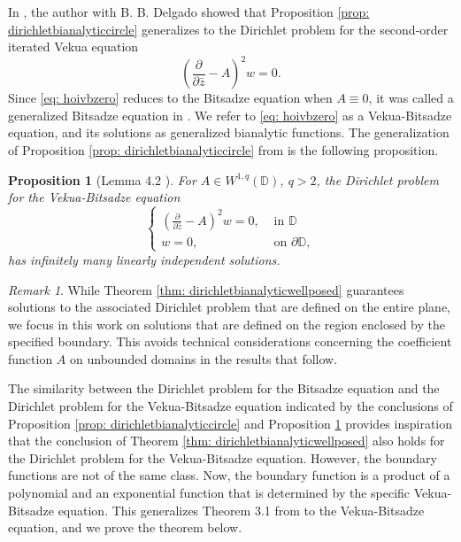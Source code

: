 \documentclass[12pt,reqno]{amsart}
\newtheorem{prop}[theorem]{Proposition}
\theoremstyle{definition}
\theoremstyle{remark}
\newtheorem{comm}[theorem]{Remark}
\newcommand{\p}{\partial}
\newcommand{\z}{\bar z}
\newcommand{\disk}{\mathbb{D}}
\begin{document}
            In \cite{WBD2}, the author with B. B. Delgado showed that Proposition \ref{prop: dirichletbianalyticcircle} generalizes to the Dirichlet problem for the second-order iterated Vekua equation 
            \begin{equation}\label{eq: hoivbzero}
                \left( \frac{\p}{\p\z} - A\right)^2 w = 0.
            \end{equation}
            Since \eqref{eq: hoivbzero} reduces to the Bitsadze equation when $A \equiv 0$, it was called a generalized Bitsadze equation in \cite{WBD2}. We refer to \eqref{eq: hoivbzero} as a Vekua-Bitsadze equation, and its solutions as generalized bianalytic functions. The generalization of Proposition \ref{prop: dirichletbianalyticcircle} from \cite{WBD2} is the following proposition. 

            

            \begin{prop}[Lemma 4.2 \cite{WBD2}]\label{lem: generalbitsadzelindep}
    For $A \in W^{1,q}(\disk)$, $q>2$, the Dirichlet problem for the Vekua-Bitsadze equation
    \begin{equation}\label{dbvp}\begin{cases}
        \left( \frac{\p}{\p\z} - A\right)^2 w = 0, & \text{ in } \disk\\
        w = 0, & \text{ on } \p \disk,
    \end{cases}\end{equation}
    has infinitely many linearly independent solutions.
    \end{prop}

        \begin{comm}
            While Theorem \ref{thm: dirichletbianalyticwellposed} guarantees solutions to the associated Dirichlet problem that are defined on the entire plane, we focus in this work on solutions that are defined on the region enclosed by the specified boundary. This avoids technical considerations concerning the coefficient function $A$ on unbounded domains in the results that follow. 
        \end{comm}

        

            The similarity between the Dirichlet problem for the Bitsadze equation and the Dirichlet problem for the Vekua-Bitsadze equation indicated by the conclusions of Proposition \ref{prop: dirichletbianalyticcircle} and Proposition \ref{lem: generalbitsadzelindep} provides inspiration that the conclusion of Theorem \ref{thm: dirichletbianalyticwellposed} also holds for the Dirichlet problem for the Vekua-Bitsadze equation. However, the boundary functions are not of the same class. Now, the boundary function is a product of a polynomial and an exponential function that is determined by the specific Vekua-Bitsadze equation. This generalizes Theorem 3.1 from \cite{Dirichletbianalytic} to the Vekua-Bitsadze equation, and we prove the theorem below. 
\end{document}
